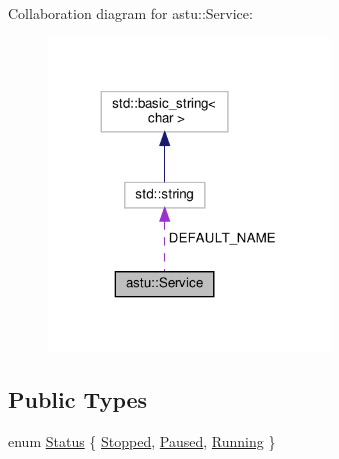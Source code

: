 Collaboration diagram for astu\+:\+:Service\+:\nopagebreak
\begin{figure}[H]
\begin{center}
\leavevmode
\includegraphics[width=212pt]{classastu_1_1Service__coll__graph}
\end{center}
\end{figure}
\subsection*{Public Types}
\begin{DoxyCompactItemize}
\item 
enum \hyperlink{classastu_1_1Service_a5ef3b0bb1fb8a504afe708ee4dd8371e}{Status} \{ \hyperlink{classastu_1_1Service_a5ef3b0bb1fb8a504afe708ee4dd8371ea540be62ed0d93807434c4aead2df4403}{Stopped}, 
\hyperlink{classastu_1_1Service_a5ef3b0bb1fb8a504afe708ee4dd8371eab7d0f17617156ca782dda5cdf218e536}{Paused}, 
\hyperlink{classastu_1_1Service_a5ef3b0bb1fb8a504afe708ee4dd8371ea76f0ad4a03398154d25817e5aae795c0}{Running}
 \}
\end{DoxyCompactItemize}
